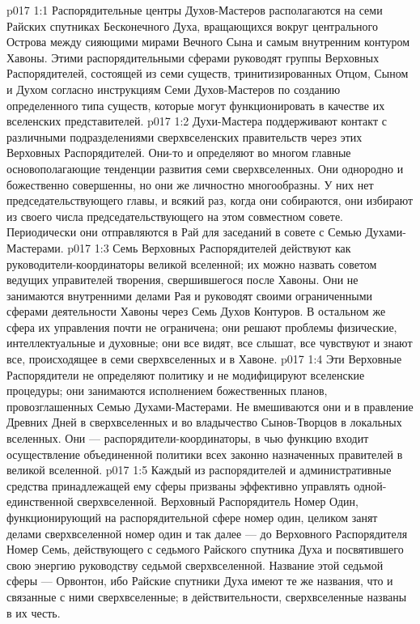\vs p017 1:1 Распорядительные центры Духов\hyp{}Мастеров располагаются на семи Райских спутниках Бесконечного Духа, вращающихся вокруг центрального Острова между сияющими мирами Вечного Сына и самым внутренним контуром Хавоны. Этими распорядительными сферами руководят группы Верховных Распорядителей, состоящей из семи существ, тринитизированных Отцом, Сыном и Духом согласно инструкциям Семи Духов\hyp{}Мастеров по созданию определенного типа существ, которые могут функционировать в качестве их вселенских представителей.
\vs p017 1:2 Духи\hyp{}Мастера поддерживают контакт с различными подразделениями сверхвселенских правительств через этих Верховных Распорядителей. Они\hyp{}то и определяют во многом главные основополагающие тенденции развития семи сверхвселенных. Они однородно и божественно совершенны, но они же личностно многообразны. У них нет председательствующего главы, и всякий раз, когда они собираются, они избирают из своего числа председательствующего на этом совместном совете. Периодически они отправляются в Рай для заседаний в совете с Семью Духами\hyp{}Мастерами.
\vs p017 1:3 \pc Семь Верховных Распорядителей действуют как руководители\hyp{}координаторы великой вселенной; их можно назвать советом ведущих управителей творения, свершившегося после Хавоны. Они не занимаются внутренними делами Рая и руководят своими ограниченными сферами деятельности Хавоны через Семь Духов Контуров. В остальном же сфера их управления почти не ограничена; они решают проблемы физические, интеллектуальные и духовные; они все видят, все слышат, все чувствуют и знают все, происходящее в семи сверхвселенных и в Хавоне.
\vs p017 1:4 Эти Верховные Распорядители не определяют политику и не модифицируют вселенские процедуры; они занимаются исполнением божественных планов, провозглашенных Семью Духами\hyp{}Мастерами. Не вмешиваются они и в правление Древних Дней в сверхвселенных и во владычество Сынов\hyp{}Творцов в локальных вселенных. Они --- распорядители\hyp{}координаторы, в чью функцию входит осуществление объединенной политики всех законно назначенных правителей в великой вселенной.
\vs p017 1:5 Каждый из распорядителей и административные средства принадлежащей ему сферы призваны эффективно управлять одной\hyp{}единственной сверхвселенной. Верховный Распорядитель Номер Один, функционирующий на распорядительной сфере номер один, целиком занят делами сверхвселенной номер один и так далее --- до Верховного Распорядителя Номер Семь, действующего с седьмого Райского спутника Духа и посвятившего свою энергию руководству седьмой сверхвселенной. Название этой седьмой сферы --- Орвонтон, ибо Райские спутники Духа имеют те же названия, что и связанные с ними сверхвселенные; в действительности, сверхвселенные названы в их честь.
